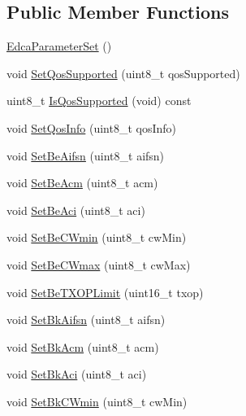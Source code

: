 \subsection*{Public Member Functions}
\begin{DoxyCompactItemize}
\item 
\hyperlink{classns3_1_1EdcaParameterSet_aad6e45108e2bec01f05038b1410a48de}{Edca\+Parameter\+Set} ()
\item 
void \hyperlink{classns3_1_1EdcaParameterSet_ae88fa048ad94b769d133fcbea34003d0}{Set\+Qos\+Supported} (uint8\+\_\+t qos\+Supported)
\item 
uint8\+\_\+t \hyperlink{classns3_1_1EdcaParameterSet_a5200e0c68743d8fdc1de81c987e16191}{Is\+Qos\+Supported} (void) const 
\item 
void \hyperlink{classns3_1_1EdcaParameterSet_a8b2ea3866e8c7b97de69e8e9ee96f8b1}{Set\+Qos\+Info} (uint8\+\_\+t qos\+Info)
\item 
void \hyperlink{classns3_1_1EdcaParameterSet_afc643ba4210b5d4620407d0e4abcfe93}{Set\+Be\+Aifsn} (uint8\+\_\+t aifsn)
\item 
void \hyperlink{classns3_1_1EdcaParameterSet_accd97ccb12516c2261cedad241770f44}{Set\+Be\+Acm} (uint8\+\_\+t acm)
\item 
void \hyperlink{classns3_1_1EdcaParameterSet_aaccf6b8f599ac926f6e7d4f3d51f2349}{Set\+Be\+Aci} (uint8\+\_\+t aci)
\item 
void \hyperlink{classns3_1_1EdcaParameterSet_a8b7e5cb7e61ea782724cff73c4e7721c}{Set\+Be\+C\+Wmin} (uint8\+\_\+t cw\+Min)
\item 
void \hyperlink{classns3_1_1EdcaParameterSet_ac50859c13e8d6cae055a164a650ae137}{Set\+Be\+C\+Wmax} (uint8\+\_\+t cw\+Max)
\item 
void \hyperlink{classns3_1_1EdcaParameterSet_ab43a494ed92c6bfe79cc461debcd6096}{Set\+Be\+T\+X\+O\+P\+Limit} (uint16\+\_\+t txop)
\item 
void \hyperlink{classns3_1_1EdcaParameterSet_abcc83f5e262928b4d5409f1423d2cb7b}{Set\+Bk\+Aifsn} (uint8\+\_\+t aifsn)
\item 
void \hyperlink{classns3_1_1EdcaParameterSet_a2d1d0121b7a2e6d4aa9b32c27534dd22}{Set\+Bk\+Acm} (uint8\+\_\+t acm)
\item 
void \hyperlink{classns3_1_1EdcaParameterSet_adf3e773d255cf5b0d88a8f229e89fbee}{Set\+Bk\+Aci} (uint8\+\_\+t aci)
\item 
void \hyperlink{classns3_1_1EdcaParameterSet_a7565d52cdecdf64b06aef1b9aabae1ce}{Set\+Bk\+C\+Wmin} (uint8\+\_\+t cw\+Min)
\item 

\end{DoxyCompactItemize}
